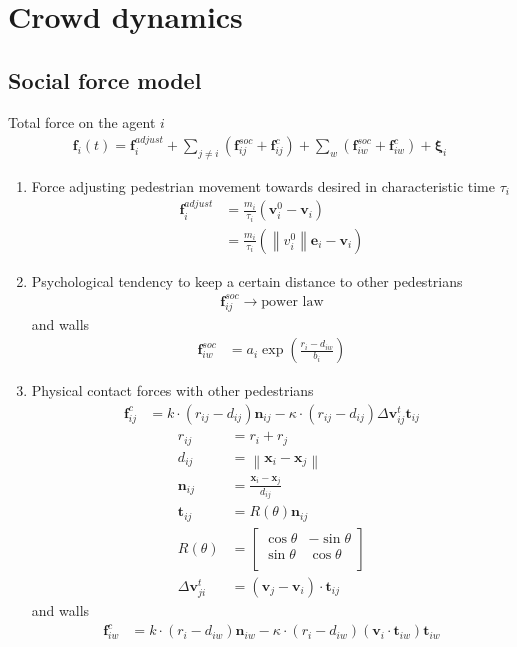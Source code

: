 \section{Crowd dynamics}
\subsection{Social force model}
Total force on the agent $ i $
\begin{align}
\mathbf{f}_{i}(t) = \mathbf{f}_{i}^{adjust} + \sum_{j\neq i}^{} \left(\mathbf{f}_{ij}^{soc} + \mathbf{f}_{ij}^{c}\right) + \sum_{w}^{} \left(\mathbf{f}_{iw}^{soc} + \mathbf{f}_{iw}^{c}\right) + \boldsymbol{\xi}_{i}
\end{align}

\begin{enumerate}[label=\roman{enumi})]
\item 
Force adjusting pedestrian movement towards desired in characteristic time $ \tau_{i} $
\begin{align}
\mathbf{f}_{i}^{adjust} &= \frac{m_{i}}{\tau_{i}} (\mathbf{v}_{i}^{0} - \mathbf{v}_{i}) \\
&=  \frac{m_{i}}{\tau_{i}} (\left\|v_{i}^{0}\right\| \mathbf{e}_{i} - \mathbf{v}_{i})
\end{align}


\item 
Psychological tendency to keep a certain distance to other pedestrians
\begin{align}
\mathbf{f}_{ij}^{soc} \to \text{power law}
\end{align}
and walls
\begin{align}
\mathbf{f}_{iw}^{soc} &= a_{i} \exp\left(\frac{r_{i} - d_{iw}}{b_{i}}\right)
\end{align}


\item 
Physical contact forces with other pedestrians
\begin{align}
\mathbf{f}_{ij}^{c} &= k \cdot (r_{ij} - d_{ij}) \mathbf{n}_{ij} - \kappa \cdot (r_{ij} - d_{ij}) \Delta \mathbf{v}_{ij}^{t} \mathbf{t}_{ij}
\end{align}
\begin{align}
r_{ij} &= r_{i} + r_{j} \\
d_{ij} &= \left\|\mathbf{x}_{i} - \mathbf{x}_{j}\right\| \\
\mathbf{n}_{ij} &= \frac{\mathbf{x}_{i} - \mathbf{x}_{j}}{d_{ij}} \\
\mathbf{t}_{ij} &= R(\theta) \mathbf{n}_{ij} \\
R(\theta) &= \begin{bmatrix}\cos \theta & -\sin \theta \\\sin \theta & \cos \theta \\\end{bmatrix} \\
\Delta \mathbf{v}_{ji}^{t} &= (\mathbf{v}_{j} - \mathbf{v}_{i}) \cdot \mathbf{t}_{ij}
\end{align}
and walls
\begin{align}
\mathbf{f}_{iw}^{c} &= k \cdot (r_{i} - d_{iw}) \mathbf{n}_{iw} - \kappa \cdot (r_{i} - d_{iw}) (\mathbf{v}_{i} \cdot \mathbf{t}_{iw}) \mathbf{t}_{iw}
\end{align}



\end{enumerate}
